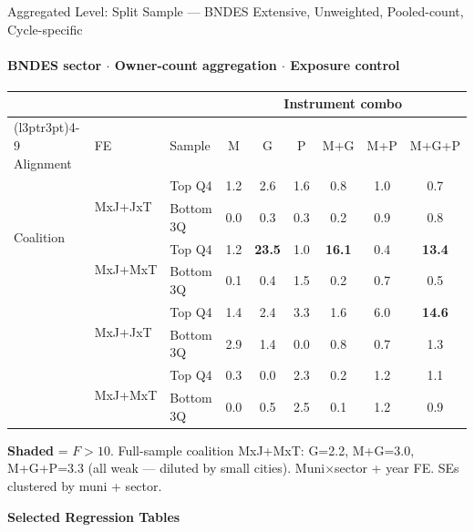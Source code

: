 \documentclass[aspectratio=169,10pt]{beamer}
\newcommand{\fpass}[1]{\cellcolor{pass}\textbf{#1}}
\begin{document}
\begin{frame}[t]{Aggregated Level: Split Sample --- BNDES Extensive, Unweighted, Pooled-count, Cycle-specific}
\framesubtitle{BNDES sector $\cdot$ Owner-count aggregation $\cdot$ Exposure control}
\begin{center}
\footnotesize
\setlength{\tabcolsep}{4pt}
\renewcommand{\arraystretch}{1.05}
\begin{tabular}{@{}lllcccccc@{}}
\toprule
 & & & \multicolumn{6}{c}{Instrument combo} \\
\cmidrule(l{3pt}r{3pt}){4-9}
Alignment & FE & Sample & M & G & P & M+G & M+P & M+G+P \\
\midrule
\multirow{4}{*}{Coalition}
 & \multirow{2}{*}{MxJ+JxT}
   & Top Q4    & 1.2 & 2.6           & 1.6 & 0.8           & 1.0 & 0.7           \\
 & & Bottom 3Q & 0.0 & 0.3           & 0.3 & 0.2           & 0.9 & 0.8           \\
 & \multirow{2}{*}{MxJ+MxT}
   & Top Q4    & 1.2 & \fpass{23.5}  & 1.0 & \fpass{16.1}  & 0.4 & \fpass{13.4}  \\
 & & Bottom 3Q & 0.1 & 0.4           & 1.5 & 0.2           & 0.7 & 0.5           \\
\addlinespace[4pt]
\multirow{4}{*}{Party}
 & \multirow{2}{*}{MxJ+JxT}
   & Top Q4    & 1.4 & 2.4           & 3.3 & 1.6           & 6.0 & \fpass{14.6}  \\
 & & Bottom 3Q & 2.9 & 1.4           & 0.0 & 0.8           & 0.7 & 1.3           \\
 & \multirow{2}{*}{MxJ+MxT}
   & Top Q4    & 0.3 & 0.0           & 2.3 & 0.2           & 1.2 & 1.1           \\
 & & Bottom 3Q & 0.0 & 0.5           & 2.5 & 0.1           & 1.2 & 0.9           \\
\bottomrule
\end{tabular}
\end{center}
{\scriptsize \colorbox{pass}{\textbf{Shaded}} = $F>10$.
Full-sample coalition MxJ+MxT: G=2.2, M+G=3.0, M+G+P=3.3 (all weak --- diluted by small cities).
Muni$\times$sector + year FE. SEs clustered by muni + sector.}
\end{frame}


\begin{frame}[plain]
\begin{center}
{\Large\textbf{Selected Regression Tables}}
\end{center}
\end{frame}
\end{document}
